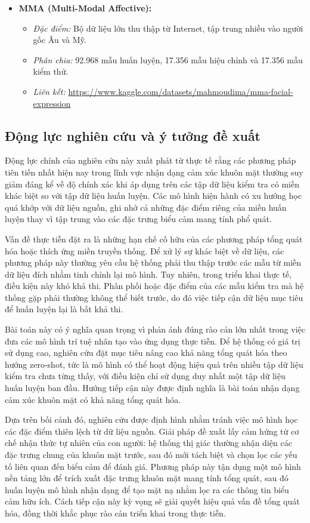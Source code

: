 \begin{itemize}
    \item \textbf{MMA (Multi-Modal Affective):}
    \begin{itemize}
        \item \textit{Đặc điểm:} Bộ dữ liệu lớn thu thập từ Internet, tập trung nhiều vào người gốc Âu và Mỹ.
        \item \textit{Phân chia:} 92.968 mẫu huấn luyện, 17.356 mẫu hiệu chỉnh và 17.356 mẫu kiểm thử.
        \item \textit{Liên kết:} \url{https://www.kaggle.com/datasets/mahmoudima/mma-facial-expression}
    \end{itemize}
\end{itemize}

\subsection{Động lực nghiên cứu và ý tưởng đề xuất}

Động lực chính của nghiên cứu này xuất phát từ thực tế rằng các phương pháp tiên tiến nhất hiện nay trong lĩnh vực nhận dạng cảm xúc khuôn mặt thường suy giảm đáng kể về độ chính xác khi áp dụng trên các tập dữ liệu kiểm tra có miền khác biệt so với tập dữ liệu huấn luyện. Các mô hình hiện hành có xu hướng học quá khớp với dữ liệu nguồn, ghi nhớ cả những đặc điểm riêng của miền huấn luyện thay vì tập trung vào các đặc trưng biểu cảm mang tính phổ quát.

Vấn đề thực tiễn đặt ra là những hạn chế cố hữu của các phương pháp tổng quát hóa hoặc thích ứng miền truyền thống. Để xử lý sự khác biệt về dữ liệu, các phương pháp này thường yêu cầu hệ thống phải thu thập trước các mẫu từ miền dữ liệu đích nhằm tinh chỉnh lại mô hình. Tuy nhiên, trong triển khai thực tế, điều kiện này khó khả thi. Phân phối hoặc đặc điểm của các mẫu kiểm tra mà hệ thống gặp phải thường không thể biết trước, do đó việc tiếp cận dữ liệu mục tiêu để huấn luyện lại là bất khả thi.

Bài toán này có ý nghĩa quan trọng vì phản ánh đúng rào cản lớn nhất trong việc đưa các mô hình trí tuệ nhân tạo vào ứng dụng thực tiễn. Để hệ thống có giá trị sử dụng cao, nghiên cứu đặt mục tiêu nâng cao khả năng tổng quát hóa theo hướng zero-shot, tức là mô hình có thể hoạt động hiệu quả trên nhiều tập dữ liệu kiểm tra chưa từng thấy, với điều kiện chỉ sử dụng duy nhất một tập dữ liệu huấn luyện ban đầu. Hướng tiếp cận này được định nghĩa là bài toán nhận dạng cảm xúc khuôn mặt có khả năng tổng quát hóa.

Dựa trên bối cảnh đó, nghiên cứu được định hình nhằm tránh việc mô hình học các đặc điểm thiên lệch từ dữ liệu nguồn. Giải pháp đề xuất lấy cảm hứng từ cơ chế nhận thức tự nhiên của con người: hệ thống thị giác thường nhận diện các đặc trưng chung của khuôn mặt trước, sau đó mới tách biệt và chọn lọc các yếu tố liên quan đến biểu cảm để đánh giá. Phương pháp này tận dụng một mô hình nền tảng lớn để trích xuất đặc trưng khuôn mặt mang tính tổng quát, sau đó huấn luyện mô hình nhận dạng để tạo mặt nạ nhằm lọc ra các thông tin biểu cảm hữu ích. Cách tiếp cận này kỳ vọng sẽ giải quyết hiệu quả vấn đề tổng quát hóa, đồng thời khắc phục rào cản triển khai trong thực tiễn.

